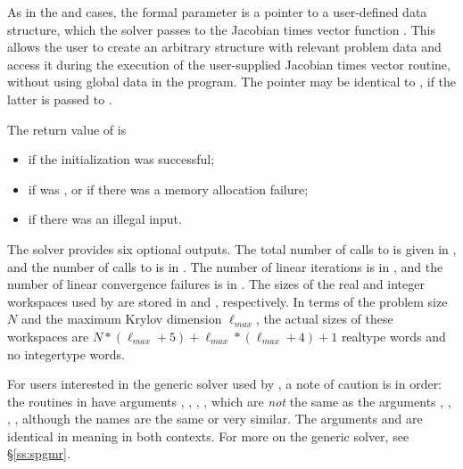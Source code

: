 \begin{itemize}
  As
  in the {\cvdense} and {\cvband} cases,  the  formal parameter
   is a pointer to a user-defined data structure, which
  the {\cvspgmr} solver passes to the Jacobian times vector function .  
  This allows the user to create an arbitrary structure with relevant problem
  data and access it during the execution of the user-supplied Jacobian times
  vector routine, without using global data in the program.  The pointer
   may be identical to , if the latter is
  passed to .
  
  The return value  of  is
  \begin{itemize}
  \item {}
    if the {\cvspgmr} initialization was successful;
  \item {}
    if  was , or if there was a memory allocation failure;
  \item {}
    if there was an illegal input.
  \end{itemize}
  
  The {\cvspgmr} solver provides six optional outputs.
  The total number of calls to  is given in \id{iopt[}\id{]},
  and the number of calls to  is in \id{iopt[}\id{]}.
  The number of linear iterations is in \id{iopt[}\id{]},
  and the number of linear convergence failures is in \id{iopt[}\id{]}.
  The sizes of the real and integer workspaces used by {\cvspgmr} are stored in
  \id{iopt[}\id{]} and \id{iopt[}\id{]}, respectively.
  In terms of the
  problem size $N$ and the maximum Krylov dimension $\ell_{max}$,
  the actual sizes of these workspaces are 
  $N*(\ell_{max} + 5) + \ell_{max}*(\ell_{max} + 4) + 1$ realtype words and
  no integertype words.
  
  For users interested in the generic {\spgmr} solver used by {\cvspgmr}, 
  a note of caution is in order: the routines in {\spgmr} have arguments
  , , , , which are {\em not} 
  the same as the  arguments , , , 
  , although the names are the same or very similar.
  The arguments  and  are identical in meaning in both
  contexts. For more on the generic {\spgmr} solver, see \S\ref{ss:spgmr}.
  

\end{itemize}


